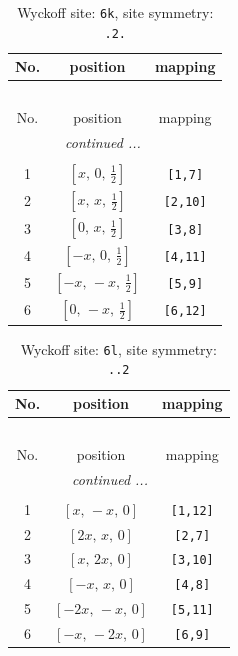 \documentclass[fleqn,8pt]{jsarticle}
\begin{document}
\renewcommand{\arraystretch}{1.2}
\begin{longtable}{ccc}
\caption{Wyckoff site: {\tt 6k}, site symmetry: {\tt .2.}}
 \\
 \hline \hline
No. & position & mapping \\ \hline \endfirsthead

\multicolumn{2}{l}{\tablename\ \thetable{}} \\
 \hline \hline
No. & position & mapping \\ \hline \endhead

 \hline \hline
\multicolumn{2}{r}{\footnotesize\it continued ...} \\ \endfoot

 \hline \hline
\multicolumn{2}{r}{} \\ \endlastfoot

1 & $\left[ x,\, 0,\, \frac{1}{2} \right]$ & {\tt [1,7]} \\ \hline
2 & $\left[ x,\, x,\, \frac{1}{2} \right]$ & {\tt [2,10]} \\ \hline
3 & $\left[ 0,\, x,\, \frac{1}{2} \right]$ & {\tt [3,8]} \\ \hline
4 & $\left[ - x,\, 0,\, \frac{1}{2} \right]$ & {\tt [4,11]} \\ \hline
5 & $\left[ - x,\, - x,\, \frac{1}{2} \right]$ & {\tt [5,9]} \\ \hline
6 & $\left[ 0,\, - x,\, \frac{1}{2} \right]$ & {\tt [6,12]} \\
\end{longtable}
\renewcommand{\arraystretch}{1.2}
\begin{longtable}{ccc}
\caption{Wyckoff site: {\tt 6l}, site symmetry: {\tt ..2}}
 \\
 \hline \hline
No. & position & mapping \\ \hline \endfirsthead

\multicolumn{2}{l}{\tablename\ \thetable{}} \\
 \hline \hline
No. & position & mapping \\ \hline \endhead

 \hline \hline
\multicolumn{2}{r}{\footnotesize\it continued ...} \\ \endfoot

 \hline \hline
\multicolumn{2}{r}{} \\ \endlastfoot

1 & $\left[ x,\, - x,\, 0 \right]$ & {\tt [1,12]} \\ \hline
2 & $\left[ 2 x,\, x,\, 0 \right]$ & {\tt [2,7]} \\ \hline
3 & $\left[ x,\, 2 x,\, 0 \right]$ & {\tt [3,10]} \\ \hline
4 & $\left[ - x,\, x,\, 0 \right]$ & {\tt [4,8]} \\ \hline
5 & $\left[ - 2 x,\, - x,\, 0 \right]$ & {\tt [5,11]} \\ \hline
6 & $\left[ - x,\, - 2 x,\, 0 \right]$ & {\tt [6,9]} \\
\end{longtable}
\end{document}
